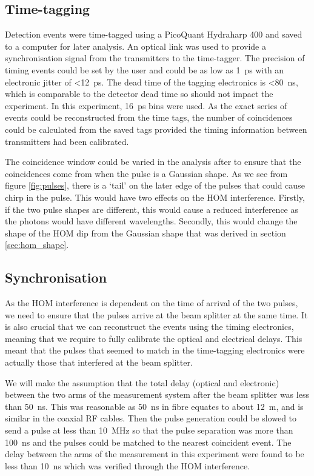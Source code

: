 \subsection{Time-tagging}

Detection events were time-tagged using a PicoQuant Hydraharp 400 and saved to a computer for later analysis. An optical link was used to provide a synchronisation signal from the transmitters to the time-tagger. The precision of timing events could be set by the user and could be as low as \SI{1}{\ps} with an electronic jitter of \SI{<12}{\ps}. The dead time of the tagging electronics is \SI{<80}{\ns}, which is comparable to the detector dead time so should not impact the experiment. In this experiment, \SI{16}{\ps} bins were used. As the exact series of events could be reconstructed from the time tags, the number of coincidences could be calculated from the saved tags provided the timing information between transmitters had been calibrated.

The coincidence window could be varied in the analysis after to ensure that the coincidences come from when the pulse is a Gaussian shape. As we see from figure \ref{fig:pulses}, there is a `tail' on the later edge of the pulses that could cause chirp in the pulse. This would have two effects on the \ac{HOM} interference. Firstly, if the two pulse shapes are different, this would cause a reduced interference as the photons would have different wavelengths. Secondly, this would change the shape of the \ac{HOM} dip from the Gaussian shape that was derived in section \ref{sec:hom_shape}.

\subsection{Synchronisation}

As the \ac{HOM} interference is dependent on the time of arrival of the two pulses, we need to ensure that the pulses arrive at the beam splitter at the same time. It is also crucial that we can reconstruct the events using the timing electronics, meaning that we require to fully calibrate the optical and electrical delays. This meant that the pulses that seemed to match in the time-tagging electronics were actually those that interfered at the beam splitter. 

We will make the assumption that the total delay (optical and electronic) between the two arms of the measurement system after the beam splitter was less than \SI{50}{\ns}. This was reasonable as \SI{50}{\ns} in fibre equates to about \SI{12}{\m}, and is similar in the coaxial RF cables. Then the pulse generation could be slowed to send a pulse at less than \SI{10}{\MHz} so that the pulse separation was more than \SI{100}{\ns} and the pulses could be matched to the nearest coincident event. The delay between the arms of the measurement in this experiment were found to be less than \SI{10}{\ns} which was verified through the \ac{HOM} interference.

